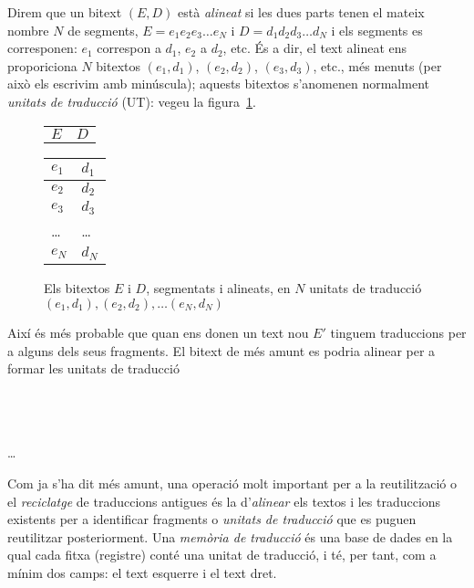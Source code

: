 Direm que un bitext $(E,D)$ està \emph{alineat} si les dues parts
tenen el mateix nombre $N$ de segments, $E= e_1 e_2 e_3 \ldots e_N$ i
$D= d_1 d_2 d_3 \ldots d_N$ i els segments es corresponen: $e_1$
correspon a $d_1$, $e_2$ a $d_2$, etc. És a dir, el text alineat ens
proporiciona $N$ bitextos $(e_1,d_1)$, $(e_2,d_2)$, $(e_3,d_3)$, etc.,
més menuts (per això els escrivim amb minúscula); aquests bitextos
s'anomenen normalment \emph{unitats de traducció} (UT): vegeu la
figura~\ref{fg:alineat}.
\begin{figure}
  \begin{center}
    \begin{tabular}{p{3cm}p{3cm}}
           $E$ & $D$      
    \end{tabular}
    \begin{tabular}{|p{3cm}|p{3cm}|}
\hline
        $e_1$ & $d_1$ \\\hline
        $e_2$ & $d_2$ \\\hline
        $e_3$ & $d_3$ \\\hline
        \ldots & \ldots \\\hline
        $e_N$ & $d_N$ \\\hline
    \end{tabular}
  \end{center}
  \caption{Els bitextos $E$ i $D$, segmentats i alineats, en $N$ unitats de traducció $(e_1,d_1), (e_2,d_2), \ldots (e_N,d_N)$}
  \label{fg:alineat}
\end{figure}



Així és més probable que quan ens donen un text nou
$E'$ tinguem traduccions per a alguns dels seus fragments. El bitext
de més amunt es podria alinear per a formar les unitats de traducció 
\begin{center}
\\ 
\\ 
\\ 
\ldots\\ 
\end{center}

Com ja s'ha dit més amunt, una operació molt important per a la
reutilització o el \emph{reciclatge} de traduccions antigues és la
d'\emph{alinear} els textos i les traduccions existents per a
identificar fragments o \emph{unitats de traducció} que es puguen
reutilitzar posteriorment.  Una \emph{memòria de traducció} és una
base de dades en la qual cada fitxa (registre) conté una unitat de
traducció, i té, per tant, com a mínim dos camps: el text esquerre i
el text dret.

